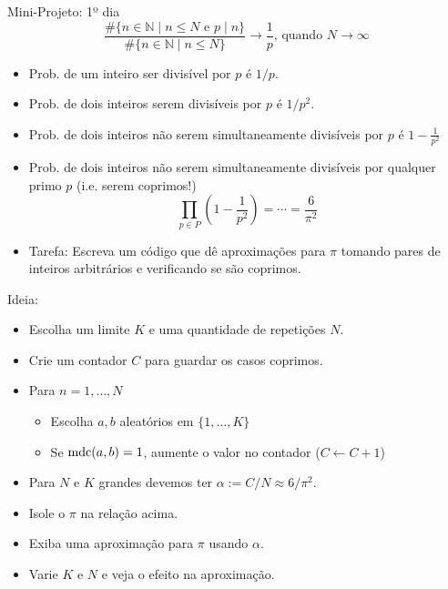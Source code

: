 \documentclass[12pt]{beamer}
\begin{document}
\begin{frame}
  {Mini-Projeto: 1º dia}
  $$
    \frac{\#\{n \in \mathbb{N} \mid n \leq N \text{ e } p \mid n\}}
    {\#\{n \in \mathbb{N} \mid n \leq N\}}
      \to \frac{1}{p} \text{, quando $N \to \infty$}
  $$
  \begin{itemize}
    \item Prob. de um inteiro ser divisível por $p$ é $1/p$.
    \item Prob. de dois inteiros serem divisíveis por $p$ é
    $1/p^2$.
    \item Prob. de dois inteiros não serem simultaneamente divisíveis por $p$
    é $1 - \frac{1}{p^2}$
    \item Prob. de dois inteiros não serem simultaneamente divisíveis por 
    qualquer primo $p$ (i.e. serem coprimos!)
    $$
      \prod_{p \in P} \left(1 - \frac{1}{p^2}\right) = \cdots = \frac{6}{\pi^2}
    $$
    \item Tarefa: Escreva um código que dê aproximações para $\pi$ tomando
    pares de inteiros arbitrários e verificando se são coprimos.
  \end{itemize}
\end{frame}

\begin{frame}
  {Ideia:}
  \begin{itemize}
    \item Escolha um limite $K$ e uma quantidade de repetições $N$.
    \item Crie um contador $C$ para guardar os casos coprimos.
    \item Para $n = 1, \dots, N$
    \begin{itemize}
      \item Escolha $a,b$ aleatórios em $\{1, \dots, K\}$
      \item Se $\operatorname{mdc}(a,b) = 1$, aumente o valor no contador ($C \leftarrow C+1$)
    \end{itemize}
    \item Para $N$ e $K$ grandes devemos ter $\alpha:= C/N \approx 6/\pi^2$.
    \item Isole o $\pi$ na relação acima.
    \item Exiba uma aproximação para $\pi$ usando $\alpha$.
    \item Varie $K$ e $N$ e veja o efeito na aproximação.

  \end{itemize}
\end{frame}
\end{document}
